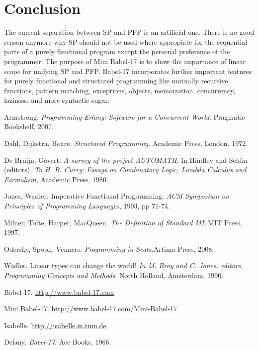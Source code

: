 \documentclass{llncs}
\begin{document}
\section{Conclusion}
The current separation between SP and PFP is an artificial one. There is no good reason anymore why SP should not be used where appropiate for the sequential parts of a purely functional program except the personal preference of the programmer.  The purpose of Mini Babel-17 is to show the importance of linear scope for unifying SP and PFP. Babel-17 incorporates further important features for purely functional and structured programming like mutually recursive functions, pattern matching, exceptions, objects, memoization, concurrency, laziness, and more syntactic sugar. 





\begin{thebibliography}{10}

Armstrong. \newblock\emph{Programming Erlang: Software for a Concurrent World}. \newblock Pragmatic Bookshelf, 2007.

Dahl, Dijkstra, Hoare. \newblock\emph{Structured Programming.} 
\newblock Academic Press, London, 1972.

De Bruijn, Govert. \newblock\emph{A survey of the project AUTOMATH}. \newblock  In Hindley and Seldin (editors), \emph{To H. B. Curry: Essays on Combinatory Logic, Lambda Calculus and Formalism}, Academic Press, 1980.

Jones, Wadler. \newblock Imperative Functional Programming. \newblock\emph{ACM Symposium on Principles of Programming Languages}, 1993, pp 71-74. 

Milner; Tofte, Harper, MacQueen. \newblock\emph{The Definition of Standard ML.}\newblock MIT Press, 1997.

Odersky, Spoon, Venners. \newblock\emph{Programming in Scala}.\newblock Artima Press, 2008.

 Wadler. \newblock Linear types can change the world! \newblock\emph{In M. Broy and C. Jones, editors, Programming Concepts and Methods}. North Holland, Amsterdam, 1990.

Babel-17. \newblock \url{http://www.babel-17.com}

Mini Babel-17. \newblock \url{http://www.babel-17.com/Mini-Babel-17}

Isabelle. \newblock \url{http://isabelle.in.tum.de}

Delany. \newblock\emph{Babel-17}. \newblock Ace Books, 1966.

\end{thebibliography}
\end{document}
